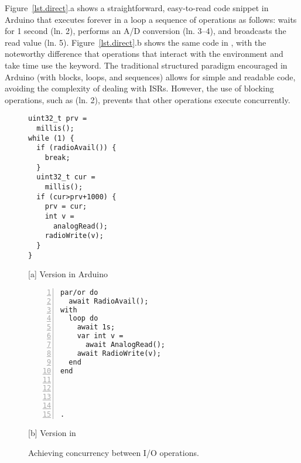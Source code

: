 Figure~\ref{lst.direct}.a shows a straightforward, easy-to-read code snippet
in Arduino that executes forever in a loop a sequence of operations as follows:
    waits for 1 second (ln. 2),
    performs an A/D conversion (ln. 3--4), and
    broadcasts the read value (ln. 5).
%
Figure~\ref{lst.direct}.b shows the same code in \CEU, with the noteworthy
difference that operations that interact with the environment and take time use
the  keyword. %
%
The traditional structured paradigm encouraged in Arduino (with blocks, loops,
and sequences) allows for simple and readable code, avoiding the complexity of
dealing with ISRs.
%
However, the use of blocking operations, such as  (ln. 2),
prevents that other operations execute concurrently.

\begin{figure}[t]
\begin{minipage}[t]{0.49\linewidth}
\begin{lstlisting}[xrightmargin=0.5cm]
uint32_t prv =
  millis();
while (1) {
  if (radioAvail()) {
    break;
  }
  uint32_t cur =
    millis();
  if (cur>prv+1000) {
    prv = cur;
    int v =
      analogRead();
    radioWrite(v);
  }
}
\end{lstlisting}
\centering\small{[a] Version in Arduino}
\end{minipage}
%
\begin{minipage}[t]{0.49\linewidth}
\begin{lstlisting}[numbers=left,xleftmargin=-0.2cm]
par/or do
  await RadioAvail();
with
  loop do
    await 1s;
    var int v =
      await AnalogRead();
    await RadioWrite(v);
  end
end




.
\end{lstlisting}
\centering\small{[b] Version in \CEU}
\end{minipage}
\caption{ Achieving concurrency between I/O operations.
\label{lst.inversion}
}
\end{figure}

